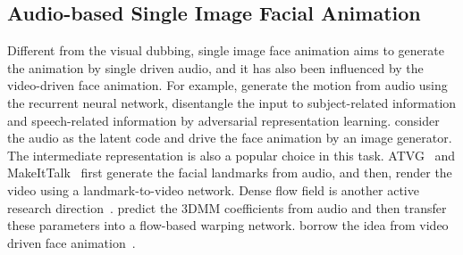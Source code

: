 
\subsection{Audio-based Single Image Facial Animation}
Different from the visual dubbing, single image face animation aims to generate the animation by single driven audio, and it has also been influenced by the video-driven face animation. For example, \cite{song2018talking} generate the motion from audio using the recurrent neural network, \cite{zhou2019talking} disentangle the input to subject-related information and speech-related information by adversarial representation learning. \cite{vougioukas2020realistic, pc-avs} consider the audio as the latent code and drive the face animation by an image generator.
The intermediate representation is also a popular choice in this task. ATVG~\cite{chen2019hierarchical} and MakeItTalk~\cite{makeittalk} first generate the facial landmarks from audio, and then, render the video using a landmark-to-video network. Dense flow field is another active research direction~\cite{2203.04036, fomm}. \cite{hdtf} predict the 3DMM coefficients from audio and then transfer these parameters into a flow-based warping network. \cite{wang2021one, wang2021audio2head} borrow the idea from video driven face animation~\cite{fomm}.








